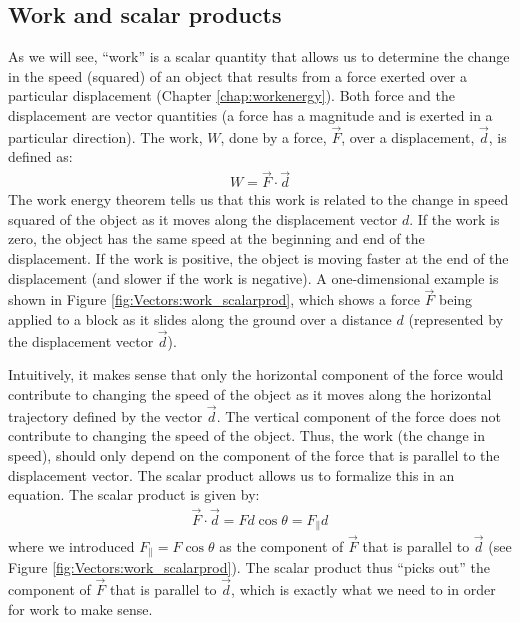 \subsection{Work and scalar products}
As we will see, ``work'' is a scalar quantity that allows us to determine the change in the speed (squared) of an object that results from a force exerted over a particular displacement (Chapter \ref{chap:workenergy}). Both force and the displacement are vector quantities (a force has a magnitude and is exerted in a particular direction). The work, $W$, done by a force, $\vec F$, over a displacement, $\vec d$, is defined as:
\begin{align*}
W = \vec F \cdot \vec d
\end{align*}
The work energy theorem tells us that this work is related to the change in speed squared of the object as it moves along the displacement vector $d$. If the work is zero, the object has the same speed at the beginning and end of the displacement. If the work is positive, the object is moving faster at the end of the displacement (and slower if the work is negative). A one-dimensional example is shown in Figure \ref{fig:Vectors:work_scalarprod}, which shows a force $\vec F$ being applied to a block as it slides along the ground over a distance $d$ (represented by the displacement vector $\vec d$).  


Intuitively, it makes sense that only the horizontal component of the force would contribute to changing the speed of the object as it moves along the horizontal trajectory defined by the vector $\vec d$. The vertical component of the force does not contribute to changing the speed of the object. Thus, the work (the change in speed), should only depend on the component of the force that is parallel to the displacement vector. The scalar product allows us to formalize this in an equation. The scalar product is given by:
\begin{align*}
\vec F \cdot \vec d = Fd\cos\theta = F_{\parallel}d
\end{align*}
where we introduced $F_{\parallel} = F\cos\theta$ as the component of $\vec F$ that is parallel to $\vec d$ (see Figure \ref{fig:Vectors:work_scalarprod}). The scalar product thus ``picks out'' the component of $\vec F$ that is parallel to $\vec d$, which is exactly what we need to in order for work to make sense.

